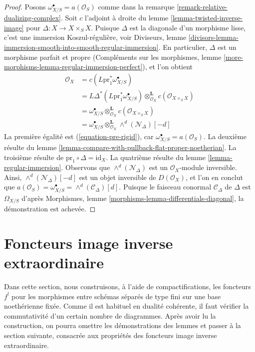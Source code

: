 \begin{proof}
Posons $\omega_{X/S}^\bullet = a(\mathcal{O}_S)$ comme dans la remarque \ref{remark-relative-dualizing-complex}. Soit $c$ l'adjoint à droite du lemme \ref{lemma-twisted-inverse-image} pour $\Delta : X \to X \times_S X$. Puisque $\Delta$ est la diagonale d'un morphisme lisse, c'est une immersion Koszul-régulière, voir Diviseurs, lemme \ref{divisors-lemma-immersion-smooth-into-smooth-regular-immersion}. En particulier, $\Delta$ est un morphisme parfait et propre (Compléments sur les morphismes, lemme \ref{more-morphisms-lemma-regular-immersion-perfect}), et l'on obtient
\begin{align*}
\mathcal{O}_X
& =
c(L\text{pr}_1^*\omega_{X/S}^\bullet) \\
& =
L\Delta^*(L\text{pr}_1^*\omega_{X/S}^\bullet)
\otimes_{\mathcal{O}_X}^\mathbf{L}
c(\mathcal{O}_{X \times_S X}) \\
& =
\omega_{X/S}^\bullet \otimes_{\mathcal{O}_X}^\mathbf{L}
c(\mathcal{O}_{X \times_S X}) \\
& =
\omega_{X/S}^\bullet
\otimes_{\mathcal{O}_X}^\mathbf{L}
\wedge^d(\mathcal{N}_\Delta)[-d]
\end{align*}
La première égalité est (\ref{equation-pre-rigid}), car $\omega_{X/S}^\bullet = a(\mathcal{O}_S)$. La deuxième résulte du lemme \ref{lemma-compare-with-pullback-flat-proper-noetherian}. La troisième résulte de $\text{pr}_1 \circ \Delta = \text{id}_X$. La quatrième résulte du lemme \ref{lemma-regular-immersion}. Observons que $\wedge^d(\mathcal{N}_\Delta)$ est un $\mathcal{O}_X$-module inversible. Ainsi, $\wedge^d(\mathcal{N}_\Delta)[-d]$ est un objet inversible de $D(\mathcal{O}_X)$, et l'on en conclut que $a(\mathcal{O}_S) = \omega_{X/S}^\bullet = \wedge^d(\mathcal{C}_\Delta)[d]$. Puisque le faisceau conormal $\mathcal{C}_\Delta$ de $\Delta$ est $\Omega_{X/S}$ d'après Morphismes, lemme \ref{morphisms-lemma-differentials-diagonal}, la démonstration est achevée.
\end{proof}







\section{Foncteurs image inverse extraordinaire}
\label{section-upper-shriek}

\noindent
Dans cette section, nous construisons, à l'aide de compactifications, les foncteurs $f^!$ pour les morphismes entre schémas séparés de type fini sur une base noethérienne fixée. Comme il est habituel en dualité cohérente, il faut vérifier la commutativité d'un certain nombre de diagrammes. Après avoir lu la construction, on pourra omettre les démonstrations des lemmes et passer à la section suivante, consacrée aux propriétés des foncteurs image inverse extraordinaire.

